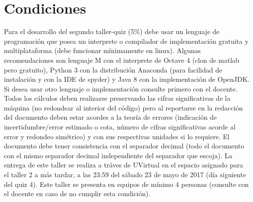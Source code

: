 \documentclass[12pt]{article}
\begin{document}
\section{Condiciones}
Para el desarrollo del segundo taller-quiz (5\%) debe usar un lenguaje de programación que posea un interprete o compilador de implementación gratuita y multiplataforma (debe funcionar mínimamente en linux). Algunas recomendaciones son lenguaje M con el interprete de Octave 4 (clon de matlab pero gratuito), Python 3 con la distribución Anaconda (para facilidad de instalación y con la IDE de spyder) y Java 8 con la implementación de OpenJDK. Si desea usar otro lenguaje o implementación consulte primero con el docente.
Todos los cálculos deben realizarse preservando las cifras significativas de la máquina (no redondear al interior del código) pero al reportarse en la redacción del documento deben estar acordes a la teoría de errores (indicación de incertidumbre/error estimado o cota, número de cifras significativas acorde al error y redondeo simétrico) y con sus respectivas unidades si lo requiere. El documento debe tener consistencia con el separador decimal (todo el documento con el mismo separador decimal independiente del separador que escoja).
La entrega de este taller se realiza a tráves de UVirtual en el espacio asignado para el taller 2 a más tardar, a las 23:59 del sábado 23 de mayo de 2017 (día siguiente del quiz 4). Este taller se presenta en equipos de mínimo 4 personas (consulte con el docente en caso de no cumplir esta condición).
\end{document}
